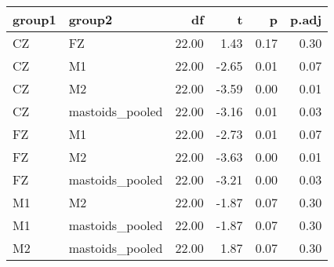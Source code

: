 \begin{table}[ht]
\centering
\begin{tabulary}{\textwidth}{llrrrr}
  \toprule
group1 & group2 & df & t & p & p.adj \\ 
  \midrule
CZ & FZ & 22.00 & 1.43 & 0.17 & 0.30 \\ 
  CZ & M1 & 22.00 & -2.65 & 0.01 & 0.07 \\ 
  CZ & M2 & 22.00 & -3.59 & 0.00 & 0.01 \\ 
  CZ & mastoids\_pooled & 22.00 & -3.16 & 0.01 & 0.03 \\ 
  FZ & M1 & 22.00 & -2.73 & 0.01 & 0.07 \\ 
  FZ & M2 & 22.00 & -3.63 & 0.00 & 0.01 \\ 
  FZ & mastoids\_pooled & 22.00 & -3.21 & 0.00 & 0.03 \\ 
  M1 & M2 & 22.00 & -1.87 & 0.07 & 0.30 \\ 
  M1 & mastoids\_pooled & 22.00 & -1.87 & 0.07 & 0.30 \\ 
  M2 & mastoids\_pooled & 22.00 & 1.87 & 0.07 & 0.30 \\ 
   \bottomrule
\end{tabulary}
\end{table}
